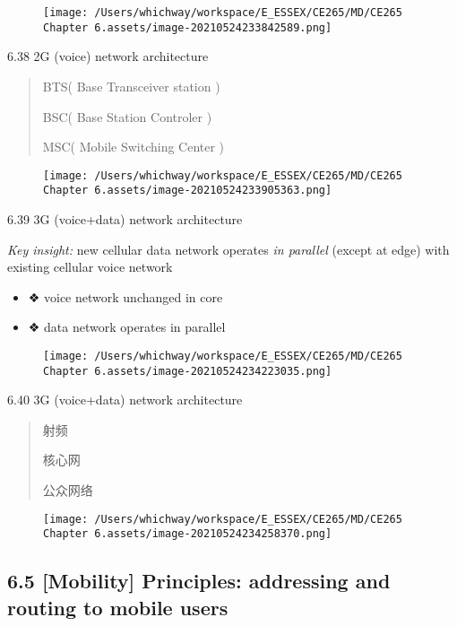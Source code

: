 \documentclass[
]{article}
\begin{document}
\begin{figure}
\centering
\texttt{[image: /Users/whichway/workspace/E\_ESSEX/CE265/MD/CE265 Chapter 6.assets/image-20210524233842589.png]}
\caption{}
\end{figure}

6.38 2G (voice) network architecture

\begin{quote}
BTS( Base Transceiver station )

BSC( Base Station Controler )

MSC( Mobile Switching Center )
\end{quote}

\begin{figure}
\centering
\texttt{[image: /Users/whichway/workspace/E\_ESSEX/CE265/MD/CE265 Chapter 6.assets/image-20210524233905363.png]}
\caption{}
\end{figure}

6.39 3G (voice+data) network architecture

\emph{Key insight:} new cellular data network operates \emph{in
parallel} (except at edge) with existing cellular voice network

\begin{itemize}
\item
  ❖ voice network unchanged in core
\item
  ❖ data network operates in parallel
\end{itemize}

\begin{figure}
\centering
\texttt{[image: /Users/whichway/workspace/E\_ESSEX/CE265/MD/CE265 Chapter 6.assets/image-20210524234223035.png]}
\caption{}
\end{figure}

6.40 3G (voice+data) network architecture

\begin{quote}
射频

核心网

公众网络
\end{quote}

\begin{figure}
\centering
\texttt{[image: /Users/whichway/workspace/E\_ESSEX/CE265/MD/CE265 Chapter 6.assets/image-20210524234258370.png]}
\caption{}
\end{figure}

\hypertarget{65-mobility-principles-addressing-and-routing-to-mobile-users}{%
\subsection{6.5 {[}Mobility{]} Principles: addressing and routing to
mobile
users}\label{65-mobility-principles-addressing-and-routing-to-mobile-users}}
\end{document}
